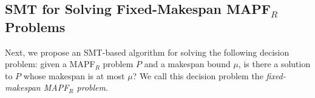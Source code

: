 \documentclass[review]{elsarticle}
\newcommand\roni[1]{\nb{\textbf{Roni:}}{green}{#1}}
\newcommand\pavel[1]{\nb{\textbf{Pavel:}}{blue}{#1}}
\newcommand{\mapfr}{\ac{MAPF}$_R$\xspace}
\begin{document}





\subsection{SMT for Solving Fixed-Makespan \mapfr Problems}

Next, we propose an SMT-based algorithm for solving the following decision problem: given a \mapfr problem $P$ and a makespan bound $\mu$, is there a solution to $P$ whose makespan is at most $\mu$? 
We call this decision problem the \emph{fixed-makespan \mapfr problem}.  
\end{document}

